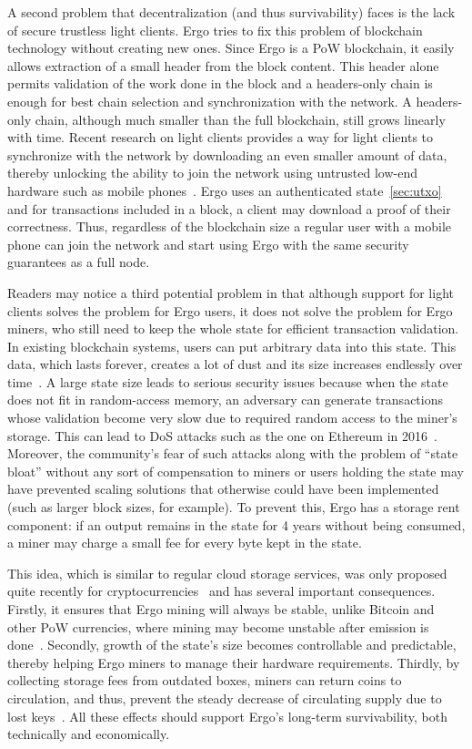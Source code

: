 A second problem that decentralization (and thus survivability) faces is the lack of secure trustless light clients. Ergo tries to fix this problem of blockchain technology without creating new ones. Since Ergo is a PoW blockchain, it easily allows extraction of a small header from the block content.
This header alone permits validation of the work done in the block and a headers-only chain is enough for best chain selection and synchronization with the network.
A headers-only chain, although much smaller than the full blockchain, still grows linearly with time.
Recent research on light clients provides a way for light clients to synchronize with the network by downloading an even smaller amount of data, thereby unlocking the ability to join the network using untrusted low-end hardware such as mobile phones~\cite{kiayias2017non,luuflyclient}.
Ergo uses an authenticated state~\ref{sec:utxo} and for transactions included in a block, a client may download a proof of their correctness.
Thus, regardless of the blockchain size a regular user with
a mobile phone can join the network and start using Ergo with the same security
guarantees as a full node.

Readers may notice a third potential problem in that although support for light clients solves the problem for Ergo users, it does not solve the problem for Ergo miners, who still need to keep the whole state for efficient transaction validation.
In existing blockchain systems, users can put arbitrary data into this state. This data, which lasts forever, creates a lot of dust and its size increases endlessly over time~\cite{perez2019another}.
A large state size leads to serious security issues because when the state does not fit in random-access memory, an adversary can generate transactions whose validation become very slow due to required random access to the miner's storage. This can lead to DoS attacks such as the one on Ethereum in 2016~\cite{ethDos2016}.
Moreover, the community's fear of such attacks along with the problem of ``state bloat'' without any sort of compensation to miners or users holding the state may have prevented scaling solutions that otherwise
could have been implemented (such as larger block sizes, for example).
To prevent this, Ergo has a storage rent component: if an
output remains in the state for 4 years without being consumed, a miner may charge a small fee for every
byte kept in the state.

This idea, which is similar to regular cloud storage services, was only proposed quite recently for cryptocurrencies~\cite{chepurnoy2017space} and has several important consequences.
Firstly, it ensures that Ergo mining will always be stable, unlike Bitcoin and other PoW currencies, where mining may become unstable after emission is done~\cite{carlsten2016instability}.
Secondly, growth of the state's size becomes controllable and predictable, thereby helping Ergo miners to manage their hardware requirements.
Thirdly, by collecting storage fees from outdated boxes, miners can return coins to circulation, and thus, prevent the steady decrease of circulating supply due to lost keys~\cite{wsj2018}.
All these effects should support Ergo's long-term survivability, both technically and economically.

